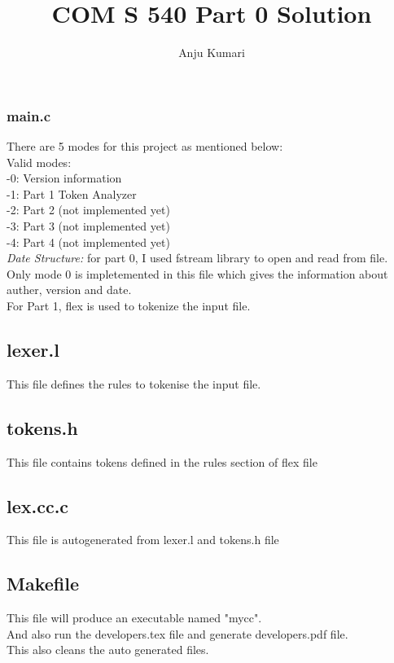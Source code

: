 \documentclass{article}
\title{COM S 540 Part 0 Solution}
\author{Anju Kumari}
\date{}
\begin{document}
   

\maketitle
\section*{}

\subsubsection*{main.c}
There are 5 modes for this project as mentioned below: \\
Valid modes: \\
-0: Version information \\
-1: Part 1 Token Analyzer \\
-2: Part 2 (not implemented yet) \\
-3: Part 3 (not implemented yet) \\
-4: Part 4 (not implemented yet) \\

{\it Date Structure:} for part 0, I used fstream library to open and read from file. \\
Only mode 0 is impletemented in this file which gives the information about auther, version and date. \\
For Part 1, flex is used to tokenize the input file.

\subsection*{lexer.l}
This file defines the rules to tokenise the input file.

\subsection*{tokens.h}
This file contains tokens defined in the rules section of flex file\\

\subsection*{lex.cc.c}
This file is autogenerated from lexer.l and tokens.h file

\subsection*{Makefile}
This file will produce an executable named "mycc". \\
And also run the developers.tex file and generate developers.pdf file. \\
This also cleans the auto generated files. \\
\end{document}
